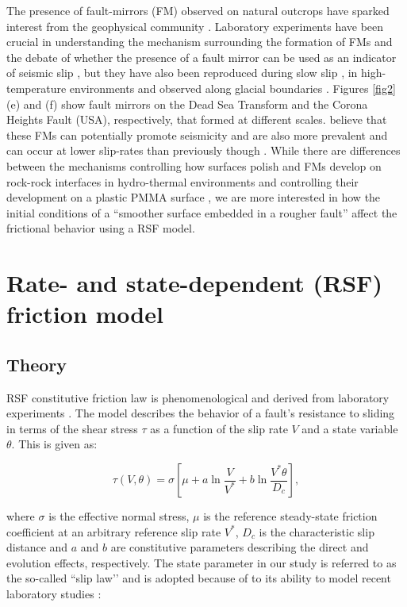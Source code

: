 \documentclass[preprint,1p, 10pt,authoryear]{elsarticle}
\begin{document}
The presence of fault-mirrors (FM) observed on natural outcrops have sparked interest from the geophysical community \citep{Fondriest2013,Kirkpatrick2013, Siman-Tov2013}.  Laboratory experiments have been crucial in understanding the mechanism surrounding the formation of FMs and the debate of whether the presence of a fault mirror can be used as an indicator of seismic slip \citep{Fondriest2013,Siman-Tov2013,Pozzi2018}, but they have also been reproduced during slow slip \citep{Tisato2012,Siman-Tov2015}, in high-temperature environments \citep{Pluymakers2017} and observed along glacial boundaries \citep{Siman-Tov2017}. Figures \ref{fig2}(e) and (f) show fault mirrors on the Dead Sea Transform and the Corona Heights Fault (USA), respectively, that formed at different scales.  \citet{Goldberg2016} believe that these FMs can potentially promote seismicity and are also more prevalent and can occur at lower slip-rates than previously though \citep{Verberne2019}.  While there are differences between the mechanisms controlling how surfaces polish and FMs develop on rock-rock interfaces in hydro-thermal environments and controlling their development on a plastic PMMA surface \citep{Bouissou1998}, we are  more interested in how the initial conditions of a ``smoother surface embedded in a rougher fault'' affect the frictional behavior using a RSF model. 

\section{Rate- and state-dependent (RSF) friction model}
\subsection{Theory}
\label{Theory}
RSF constitutive friction law is phenomenological and derived from laboratory experiments \citep{Dieterich1979, Ruina1983}.  The model describes the behavior of a fault's resistance to sliding in terms of the shear stress $\tau$ as a function of the slip rate $V$ and a state variable $\theta$. This is given as:

\begin{equation}
\label{eq5}
\tau \left( V,\theta \right) = \sigma \left[\mu + a \ln\frac{V}{V^{*}} + b \ln\frac{V^{*}\theta}{D_{c}}\right],
\end{equation}   

\noindent where $\sigma$ is the effective normal stress, $\mu$ is the reference steady-state friction coefficient at an arbitrary reference slip rate $V^{*}$, $D_{c}$ is the characteristic slip distance and $a$ and $b$ are constitutive parameters describing the direct and evolution effects, respectively.  The state parameter in our study is referred to as the so-called ``slip law’’ and is adopted because of to its ability to model recent laboratory studies \citep{Bhattacharya2015, Kaneko2011, Kaneko2016}:
\end{document}
